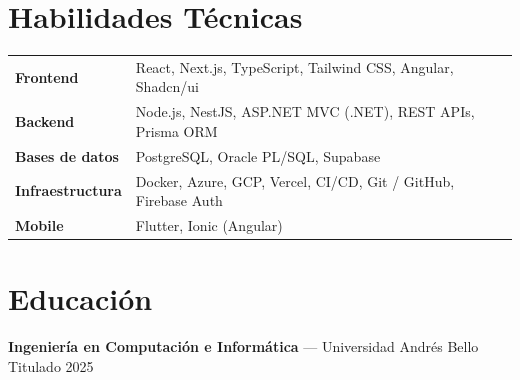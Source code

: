 \documentclass[10.5pt]{article}
\begin{document}
\vspace{4pt}

\section{Habilidades Técnicas}

\begin{tabular}{@{}ll}
\textbf{Frontend}       & React, Next.js, TypeScript, Tailwind CSS, Angular, Shadcn/ui \\[2pt]
\textbf{Backend}        & Node.js, NestJS, ASP.NET MVC (.NET), REST APIs, Prisma ORM \\[2pt]
\textbf{Bases de datos} & PostgreSQL, Oracle PL/SQL, Supabase \\[2pt]
\textbf{Infraestructura}& Docker, Azure, GCP, Vercel, CI/CD, Git / GitHub, Firebase Auth \\[2pt]
\textbf{Mobile}         & Flutter, Ionic (Angular) \\
\end{tabular}

\vspace{4pt}

\section{Educación}

\textbf{Ingeniería en Computación e Informática} --- Universidad Andrés Bello \hfill Titulado 2025
\end{document}
